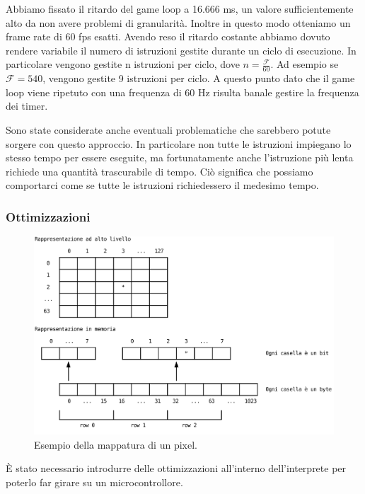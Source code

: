 \documentclass[a4paper]{article}
\begin{document}
Abbiamo fissato il ritardo del game loop a 16.666 ms, un valore sufficientemente alto da non avere problemi di granularità. Inoltre in questo modo otteniamo un frame rate di 60 fps esatti. Avendo reso il ritardo costante abbiamo dovuto rendere variabile il numero di istruzioni gestite durante un ciclo di esecuzione. In particolare vengono gestite n istruzioni per ciclo, dove $n = \frac{\mathcal{F}}{60}$. Ad esempio se $\mathcal{F} = 540$, vengono gestite 9 istruzioni per ciclo. A questo punto dato che il game loop viene ripetuto con una frequenza di 60 Hz risulta banale gestire la frequenza dei timer.

Sono state considerate anche eventuali problematiche che sarebbero potute sorgere con questo approccio. In particolare non tutte le istruzioni impiegano lo stesso tempo per essere eseguite, ma fortunatamente anche l'istruzione più lenta richiede una quantità trascurabile di tempo. Ciò significa che possiamo comportarci come se tutte le istruzioni richiedessero il medesimo tempo.

\subsubsection{Ottimizzazioni}

\begin{figure}
    \begin{center}
        \includegraphics[scale=0.50]{figures/screenopt.pdf}
    \end{center}
    \caption{Esempio della mappatura di un pixel.}
    \label{fig:screenopt}
\end{figure}

È stato necessario introdurre delle ottimizzazioni all'interno dell'interprete per poterlo far girare su un microcontrollore.
\end{document}
